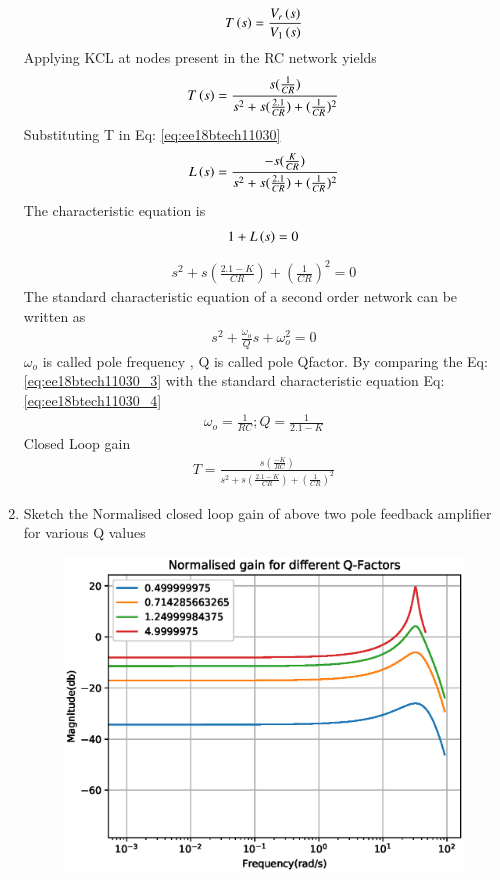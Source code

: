 \begin{enumerate}[label=\arabic*.,ref=\theenumi]
\begin{align}
T\brak{s} = \frac{V_r\brak{s}}{V_1\brak{s}}
\label{eq:ee18btech11030_1}
\end{align}
Applying KCL at nodes present in the RC network yields  
\begin{align}
T\brak{s} = \frac{s(\frac{1}{CR})}{s^2 + s(\frac{2.1}{CR}) + (\frac{1}{CR})^2}
\label{eq:ee18btech11030_2}
\end{align}
Substituting T in Eq: \ref{eq:ee18btech11030}
\begin{align}
    L\left(s\right) = \frac{-s(\frac{K}{CR})}{s^2 + s(\frac{2.1}{CR}) + (\frac{1}{CR})^2}
\end{align}
The characteristic equation is 
\begin{align}
    1+L\left(s\right)=0  
\end{align}
\begin{align}
s^2 + s(\frac{2.1-K}{CR}) + (\frac{1}{CR})^2 = 0
\label{eq:ee18btech11030_3}
\end{align}
The standard characteristic equation of a second order network can be written as 
\begin{align}
    s^2 + \frac{\omega_o}{Q}s + \omega_o^2 = 0
    \label{eq:ee18btech11030_4}
\end{align}
$\omega_o$ is called pole frequency , Q is called pole Qfactor. 
By comparing the Eq:\ref{eq:ee18btech11030_3} with the standard characteristic equation Eq:\ref{eq:ee18btech11030_4}
\begin{align}
   \omega_o = \frac{1}{RC} ; Q = \frac{1}{2.1-K}
\end{align}
Closed Loop gain 
\begin{align}
    T = \frac{s(\frac{-K}{RC})}{s^2 + s(\frac{2.1-K}{CR}) + (\frac{1}{CR})^2}
    \label{eq:ee18btech11030_5}
\end{align}
\item Sketch the Normalised closed loop gain of above two pole feedback amplifier for various Q values

\solution 
\begin{figure}[!h]
\centering
  \includegraphics[width=\columnwidth]{./figs/ee18btech11030/ee18btech11030_fc.eps}
\caption{}
\label{fig:ee18btech11030_fig2} 
\end{figure}


\end{enumerate}
